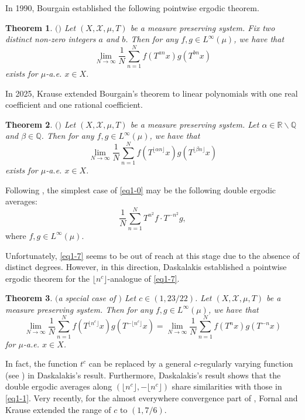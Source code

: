 \documentclass[reqno,12pt]{amsart}
\newtheorem{thm}{Theorem}[section]
\def \R {\mathbb R}
\def \Q {\mathbb Q}
\def \X {\mathcal{X}}
\numberwithin{equation}{section}
\begin{document}
In 1990, Bourgain established the following pointwise ergodic theorem.
\begin{thm}\label{thm1-1}
	$($\cite[Main Theorem]{Bourgain90}$)$ Let $(X,\X,\mu,T)$ be a measure preserving system. Fix two distinct non-zero integers $a$ and $b$. Then for any $f,g\in L^{\infty}(\mu)$, we have that 
	\begin{equation}\label{eq1-1}
		\lim_{N\to\infty}\frac{1}{N}\sum_{n=1}^{N}f(T^{an}x)g(T^{bn}x)
	\end{equation}
	exists for $\mu$-a.e. $x\in X$. 
\end{thm}
In 2025, Krause extended Bourgain's theorem to linear polynomials with one real coefficient and one rational coefficient. 
\begin{thm}\label{thm1-2}
	$($\cite[Theorem 1.1]{Krause2025}$)$ Let $(X,\X,\mu,T)$ be a measure preserving system. Let $\alpha\in \R\backslash \Q$ and $\beta\in \Q$. Then for any $f,g\in L^{\infty}(\mu)$, we have that 
	$$\lim_{N\to\infty}\frac{1}{N}\sum_{n=1}^{N}f(T^{\lfloor \alpha n\rfloor}x)g(T^{\lfloor \beta n\rfloor}x)$$ exists for $\mu$-a.e. $x\in X$.
\end{thm}
Following , the simplest case of \eqref{eq1-0} may be the following double ergodic averages:
\begin{equation}\label{eq1-7}
		\frac{1}{N}\sum_{n=1}^{N}T^{n^2}f\cdot T^{-n^2}g,
\end{equation} 
where $f,g\in L^{\infty}(\mu)$.

Unfortunately, \eqref{eq1-7} seems to be out of reach at this stage due to the absence of distinct degrees. However, in this direction, Daskalakis established a pointwise ergodic theorem for the $\lfloor n^c\rfloor$-analogue of \eqref{eq1-7}.
\begin{thm}\label{thm2-1}
	$(${\em a special case of} \cite[Theorem 1.7]{Daskalakis2025}$)$ Let $c\in (1,23/22)$. Let $(X,\X,\mu,T)$ be a measure preserving system. Then for any $f,g\in L^{\infty}(\mu)$, we have that 
	$$\lim_{N\to\infty}\frac{1}{N}\sum_{n=1}^{N}f(T^{\lfloor n^c\rfloor}x)g(T^{-\lfloor   n^c\rfloor}x)=\lim_{N\to\infty}\frac{1}{N}\sum_{n=1}^{N}f(T^{n}x)g(T^{-n}x)$$ for $\mu$-a.e. $x\in X$.
\end{thm}
In fact, the function $t^c$ can be replaced by a general $c$-regularly varying function (see \cite[Theorem 1.7]{Daskalakis2025}) in Daskalakis's result. Furthermore, Daskalakis's result shows that the double ergodic averages along $(\lfloor n^c\rfloor,-\lfloor n^c\rfloor)$ share similarities with those in \eqref{eq1-1}. Very recently, for the almost everywhere convergence part of , Fornal and Krause \cite[a special case of Proposition 1.5]{FornalKrause2026} extended the range of $c$ to $(1,7/6)$. 
\end{document}
